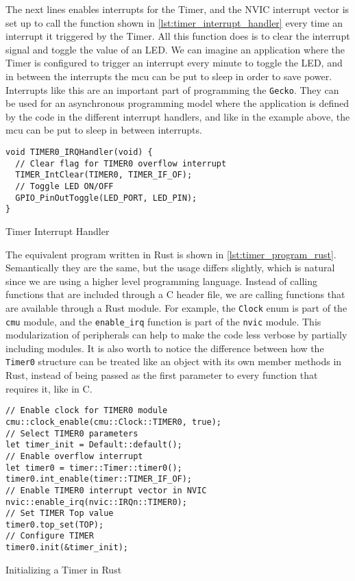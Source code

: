 The next lines enables interrupts for the Timer, and the NVIC interrupt vector is set up to call the function shown in \autoref{lst:timer_interrupt_handler} every time an interrupt it triggered by the Timer.
All this function does is to clear the interrupt signal and toggle the value of an LED.
We can imagine an application where the Timer is configured to trigger an interrupt every minute to toggle the LED, and in between the interrupts the \gls{mcu} can be put to sleep in order to save power.
Interrupts like this are an important part of programming the \texttt{Gecko}.
They can be used for an asynchronous programming model where the application is defined by the code in the different interrupt handlers, and like in the example above, the \gls{mcu} can be put to sleep in between interrupts.

\begin{listing}[h]
\begin{verbatim}
void TIMER0_IRQHandler(void) {
  // Clear flag for TIMER0 overflow interrupt
  TIMER_IntClear(TIMER0, TIMER_IF_OF);
  // Toggle LED ON/OFF
  GPIO_PinOutToggle(LED_PORT, LED_PIN);
}
\end{verbatim}
\caption{Timer Interrupt Handler}
\label{lst:timer_interrupt_handler}
\end{listing}

The equivalent program written in Rust is shown in \autoref{lst:timer_program_rust}.
Semantically they are the same, but the usage differs slightly, which is natural since we are using a higher level programming language.
Instead of calling functions that are included through a C header file, we are calling functions that are available through a Rust module.
For example, the \texttt{Clock} enum is part of the \texttt{cmu} module, and the \texttt{enable\_irq} function is part of the \texttt{nvic} module.
This modularization of peripherals can help to make the code less verbose by partially including modules.
It is also worth to notice the difference between how the \texttt{Timer0} structure can be treated like an object with its own member methods in Rust, instead of being passed as the first parameter to every function that requires it, like in C.

\begin{listing}[h]
\begin{verbatim}
// Enable clock for TIMER0 module
cmu::clock_enable(cmu::Clock::TIMER0, true);
// Select TIMER0 parameters
let timer_init = Default::default();
// Enable overflow interrupt
let timer0 = timer::Timer::timer0();
timer0.int_enable(timer::TIMER_IF_OF);
// Enable TIMER0 interrupt vector in NVIC
nvic::enable_irq(nvic::IRQn::TIMER0);
// Set TIMER Top value
timer0.top_set(TOP);
// Configure TIMER
timer0.init(&timer_init);
\end{verbatim}
\caption{Initializing a Timer in Rust}
\label{lst:timer_program_rust}
\end{listing}

